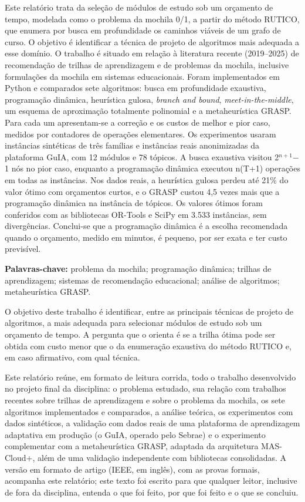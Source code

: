 \documentclass[12pt,a4paper]{article}
\newcommand{\secao}[1]{\par\vspace{1.2em}\noindent{\bfseries #1}\par\vspace{0.8em}\nopagebreak}
\begin{document}
\noindent Este relatório trata da seleção de módulos de estudo sob um orçamento de tempo, modelada como o problema da mochila 0/1, a partir do método RUTICO, que enumera por busca em profundidade os caminhos viáveis de um grafo de curso. O objetivo é identificar a técnica de projeto de algoritmos mais adequada a esse domínio. O trabalho é situado em relação à literatura recente (2019--2025) de recomendação de trilhas de aprendizagem e de problemas da mochila, inclusive formulações da mochila em sistemas educacionais. Foram implementados em Python e comparados sete algoritmos: busca em profundidade exaustiva, programação dinâmica, heurística gulosa, \textit{branch and bound}, \textit{meet-in-the-middle}, um esquema de aproximação totalmente polinomial e a metaheurística GRASP. Para cada um apresentam-se a correção e os custos de melhor e pior caso, medidos por contadores de operações elementares. Os experimentos usaram instâncias sintéticas de três famílias e instâncias reais anonimizadas da plataforma GuIA, com 12 módulos e 78 tópicos. A busca exaustiva visitou 2\ensuremath{^{n+1}}\ensuremath{-}1 nós no pior caso, enquanto a programação dinâmica executou n(T+1) operações em todas as instâncias. Nos dados reais, a heurística gulosa perdeu até 21\% do valor ótimo com orçamentos curtos, e o GRASP custou 4,5 vezes mais que a programação dinâmica na instância de tópicos. Os valores ótimos foram conferidos com as bibliotecas OR-Tools e SciPy em 3.533 instâncias, sem divergências. Conclui-se que a programação dinâmica é a escolha recomendada quando o orçamento, medido em minutos, é pequeno, por ser exata e ter custo previsível.\par\vspace{1em}
\noindent\textbf{Palavras-chave:} problema da mochila; programação dinâmica; trilhas de aprendizagem; sistemas de recomendação educacional; análise de algoritmos; metaheurística GRASP.
\clearpage
\pagestyle{abnt}

\secao{1 APRESENTAÇÃO}
O objetivo deste trabalho é identificar, entre as principais técnicas de projeto de algoritmos, a mais adequada para selecionar módulos de estudo sob um orçamento de tempo. A pergunta que o orienta é se a trilha ótima pode ser obtida com custo menor que o da enumeração exaustiva do método RUTICO e, em caso afirmativo, com qual técnica.

Este relatório reúne, em formato de leitura corrida, todo o trabalho desenvolvido no projeto final da disciplina: o problema estudado, sua relação com trabalhos recentes sobre trilhas de aprendizagem e sobre o problema da mochila, os sete algoritmos implementados e comparados, a análise teórica, os experimentos com dados sintéticos, a validação com dados reais de uma plataforma de aprendizagem adaptativa em produção (o GuIA, operado pelo Sebrae) e o experimento complementar com a metaheurística GRASP, adaptada da arquitetura MAS-Cloud+, além de uma validação independente com bibliotecas consolidadas. A versão em formato de artigo (IEEE, em inglês), com as provas formais, acompanha este relatório; este texto foi escrito para que qualquer leitor, inclusive de fora da disciplina, entenda o que foi feito, por que foi feito e o que se concluiu.
\end{document}

